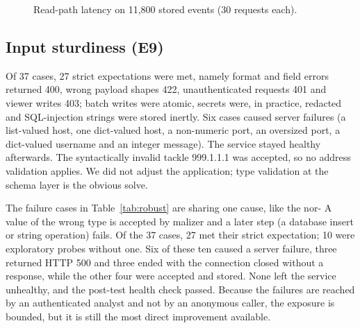 \documentclass[conference]{IEEEtran}
\begin{document}
\begin{figure}[t]
\centering
{}
\caption{Read-path latency on 11,800 stored events (30 requests each).}
\label{fig:read}
\end{figure}

\subsection{Input sturdiness (E9)}
Of 37 cases, 27 strict expectations were met, namely format and field errors returned 400, wrong payload shapes 422, unauthenticated requests 401 and viewer writes 403; batch writes were atomic, secrets were, in practice, redacted and SQL-injection strings were stored inertly. Six cases caused server failures (a list-valued host, one dict-valued host, a non-numeric port, an oversized port, a dict-valued username and an integer message). The service stayed healthy afterwards. The syntactically invalid tackle 999.1.1.1 was accepted, so no address validation applies. We did not adjust the application; type validation at the schema layer is the obvious solve.

The failure cases in Table~\ref{tab:robust} are sharing one cause, like the nor- A value of the wrong type is accepted by malizer and a later step (a database insert or string operation) fails. Of the 37 cases, 27 met their strict expectation; 10 were exploratory probes without one. Six of these ten caused a server failure, three returned HTTP 500 and three ended with the connection closed without a response, while the other four were accepted and stored. None left the service unhealthy, and the post-test health check passed. Because the failures are reached by an authenticated analyst and not by an anonymous caller, the exposure is bounded, but it is still the most direct improvement available.
\end{document}

